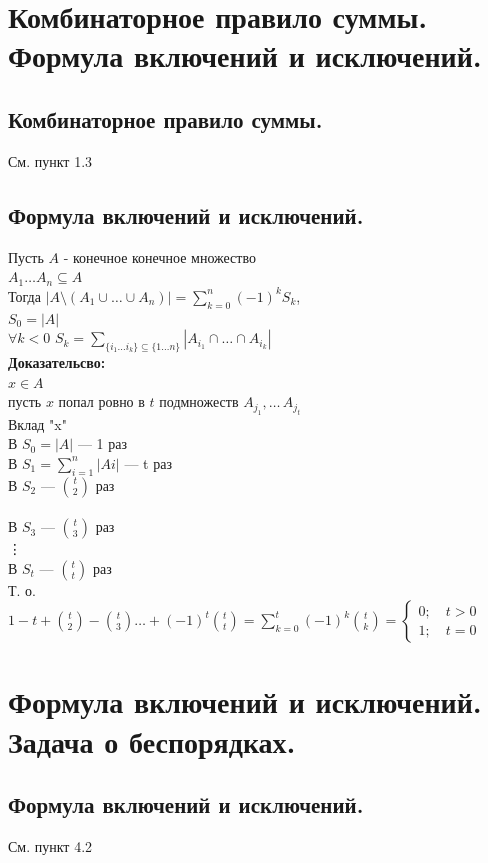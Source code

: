\documentclass[12pt]{article}
\begin{document}
\section{Комбинаторное правило суммы. Формула включений и исключений.}
\subsection{Комбинаторное правило суммы.}
	См. пункт 1.3
\subsection{Формула включений и исключений.}
	Пусть $A$ - конечное конечное множество\\
	$A_1 \ldots A_n \subseteq A$\\
	Тогда $ \displaystyle |A \setminus (A_1 \cup \ldots \cup A_n)| = \sum_{k=0}^n (-1)^kS_k$,\\
	$S_0 = |A|$\\
	$\forall k < 0$ $S_k = \displaystyle\sum_{\{ i_1 \ldots i_k\} \subseteq \{1\ldots n\}} |A_{i_1} \cap\ldots\cap A_{i_k}| $\\
\textbf{Доказательсво:}\\
	$ x \in A$\\
	пусть $x$ попал ровно в $t$ подмножеств $A_{j_1},\dotsc\,A_{j_t}$\\
	Вклад "x"\\
	В $S_0 = |A|$ — 1 раз\\
	В $S_1 = \displaystyle\sum_{i=1}^{n}|Ai|$ — t раз\\
	В $S_2$ — $\binom{t}{2}$ раз\\\\
	В $S_3$ — $\binom{t}{3}$ раз\\
	\vdots\\
	В $S_t$ — $\binom{t}{t}$ раз\\
	Т. о. $\displaystyle 1 - t + \binom{t}{2} - \binom{t}{3} \ldots + (-1)^t \binom{t}{t} = \sum_{k=0}^{t}(-1)^k \binom{t}{k} =
	\begin{cases}
	0; \quad t > 0\\
	1; \quad t = 0
	\end{cases}$\\
	\qedsymbol

\section{Формула включений и исключений. Задача о беспорядках.}
\subsection{Формула включений и исключений.}
	См. пункт 4.2
\end{document}
